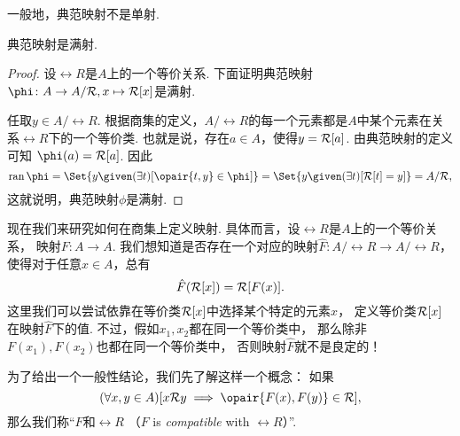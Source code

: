 一般地，典范映射不是单射.

\begin{proposition}\label{theorem:集合论.典范映射是满射}
典范映射是满射.
\begin{proof}
设\(\rel{R}\)是\(A\)上的一个等价关系.
下面证明典范映射\(
	\phi\colon A \to A/\rel{R}, x \mapsto \EquivalenceClassBH{x}[\rel{R}]
\)是满射.

任取\(y \in A/\rel{R}\).
根据商集的定义，\(A/\rel{R}\)的每一个元素都是\(A\)中某个元素在关系\(\rel{R}\)下的一个等价类.
也就是说，存在\(a \in A\)，使得\(y = \EquivalenceClassBH{a}[\rel{R}]\).
由典范映射的定义可知
\(\phi(a) = \EquivalenceClassBH{a}[\rel{R}]\).
因此\begin{equation*}
	\ran\phi
	= \Set{
		y
		\given
		(\exists t)[\opair{t,y} \in \phi]
	}
	= \Set{
		y
		\given
		(\exists t)
		[
			\EquivalenceClassBH{t}[\rel{R}]
			= y
		]
	}
	= A/\rel{R},
\end{equation*}
这就说明，典范映射\(\phi\)是满射.
\end{proof}
\end{proposition}

现在我们来研究如何在商集上定义映射.
具体而言，设\(\rel{R}\)是\(A\)上的一个等价关系，
映射\(F\colon A \to A\).
我们想知道是否存在一个对应的映射\(\hat{F}\colon A/\rel{R} \to A/\rel{R}\)，
使得对于任意\(x \in A\)，总有\begin{equation*}
	\hat{F}(\EquivalenceClassBH{x}[\rel{R}]) = \rel{R}[F(x)].
\end{equation*}
这里我们可以尝试依靠在等价类\(\EquivalenceClassBH{x}[\rel{R}]\)中选择某个特定的元素\(x\)，
定义等价类\(\EquivalenceClassBH{x}[\rel{R}]\)在映射\(\hat{F}\)下的值.
不过，假如\(x_1,x_2\)都在同一个等价类中，
那么除非\(F(x_1),F(x_2)\)也都在同一个等价类中，
否则映射\(\hat{F}\)就不是良定的！

为了给出一个一般性结论，我们先了解这样一个概念：
如果\begin{equation*}
	(\forall x,y \in A)
	[
		x \rel{R} y
		\implies
		\opair{F(x),F(y)} \in \rel{R}
	],
\end{equation*}
那么我们称“\(F\)和\(\rel{R}\) %
（\(F\) is \emph{compatible} with \(\rel{R}\)）”.

